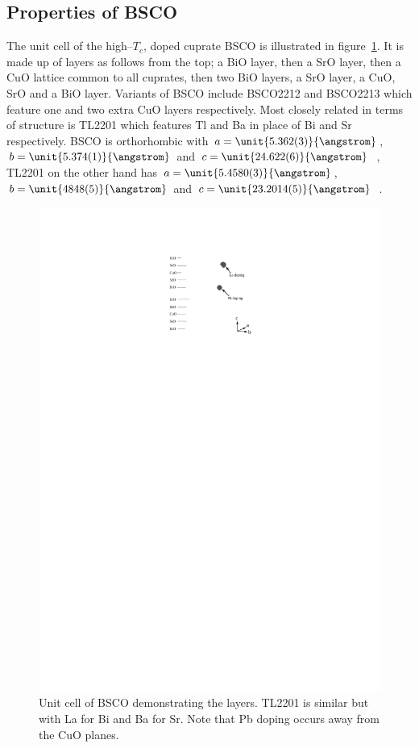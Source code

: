 
\subsection{Properties of \acs{BSCO}}
\label{Sec:Intro:PropertiesBSCO}

The unit cell of the high--$T_c$, doped cuprate \acf{BSCO} is illustrated in figure~\ref{Fig:Intro:BSCOUnitCell}. It is made up of layers as follows from the top; a BiO layer, then a SrO layer, then a CuO lattice common to all cuprates, then two BiO layers, a SrO layer, a CuO, SrO and a BiO layer. Variants of \acs{BSCO} include \ac{BSCO2212} and \ac{BSCO2213} which feature one and two extra CuO layers respectively. Most closely related in terms of structure is \acs{TL2201} which features Tl and Ba in place of Bi and Sr respectively. \ac{BSCO} is orthorhombic with $a=\unit{5.362(3)}{\angstrom}$, $b=\unit{5.374(1)}{\angstrom}$ and $c=\unit{24.622(6)}{\angstrom}$~\cite{Torardi1988}, \ac{TL2201} on the other hand has $a=\unit{5.4580(3)}{\angstrom}$, $b=\unit{4848(5)}{\angstrom}$ and $c=\unit{23.2014(5)}{\angstrom}$~\cite{Peets2007}.
\begin{figure}[htbp]
    \begin{center}
        \includegraphics[scale=1.1]{Chapter-Introduction/Figures/BSCOUnitCell/BSCOUnitCell}
        \caption{Unit cell of \acs{BSCO} demonstrating the layers. \ac{TL2201} is similar but with La for Bi and Ba for Sr. Note that Pb doping occurs away from the CuO planes.}
        \label{Fig:Intro:BSCOUnitCell}
    \end{center}
\end{figure}
